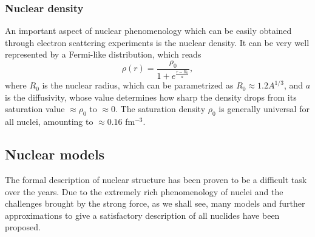 \subsubsection{Nuclear density}
An important aspect of nuclear phenomenology which can be easily obtained through electron scattering experiments \cite{Hofstadter1956} is the nuclear density. It can be very well represented by a Fermi-like distribution, which reads
\begin{equation}
    \label{eq:phen_density}
    \rho(r)=\frac{\rho_0}{1+e^{\frac{r-R_0}{a}}},
\end{equation}
where $R_0$ is the nuclear radius, which can be parametrized as $R_0\approx 1.2A^{1/3}$, and $a$ is the diffusivity, whose value determines how sharp the density drops from its saturation value $\approx \rho_0$ to $\approx 0$. The saturation density $\rho_0$ is generally universal for all nuclei, amounting to $\approx 0.16$ fm$^{-3}$.
\subsection{Nuclear models}
The formal description of nuclear structure has been proven to be a difficult task over the years. Due to the extremely rich phenomenology of nuclei and the challenges brought by the strong force, as we shall see, many models and further approximations to give a satisfactory description of all nuclides have been proposed.
